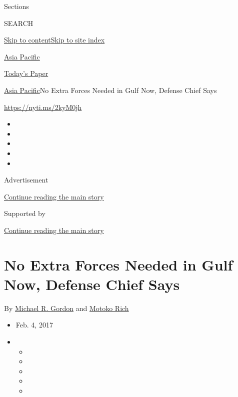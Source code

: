 Sections

SEARCH

\protect\hyperlink{site-content}{Skip to
content}\protect\hyperlink{site-index}{Skip to site index}

\href{https://www.nytimes3xbfgragh.onion/section/world/asia}{Asia
Pacific}

\href{https://myaccount.nytimes3xbfgragh.onion/auth/login?response_type=cookie\&client_id=vi}{}

\href{https://www.nytimes3xbfgragh.onion/section/todayspaper}{Today's
Paper}

\href{/section/world/asia}{Asia Pacific}\textbar{}No Extra Forces Needed
in Gulf Now, Defense Chief Says

\url{https://nyti.ms/2kyM0jh}

\begin{itemize}
\item
\item
\item
\item
\item
\end{itemize}

Advertisement

\protect\hyperlink{after-top}{Continue reading the main story}

Supported by

\protect\hyperlink{after-sponsor}{Continue reading the main story}

\hypertarget{no-extra-forces-needed-in-gulf-now-defense-chief-says}{%
\section{No Extra Forces Needed in Gulf Now, Defense Chief
Says}\label{no-extra-forces-needed-in-gulf-now-defense-chief-says}}

By \href{http://www.nytimes3xbfgragh.onion/by/michael-r-gordon}{Michael
R. Gordon} and
\href{http://www.nytimes3xbfgragh.onion/by/motoko-rich}{Motoko Rich}

\begin{itemize}
\item
  Feb. 4, 2017
\item
  \begin{itemize}
  \item
  \item
  \item
  \item
  \item
  \end{itemize}
\end{itemize}

